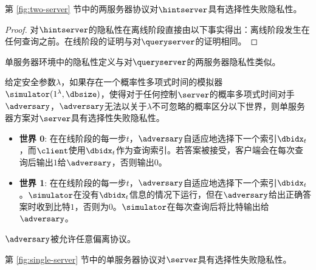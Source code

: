 \begin{theorem}
    第 \ref{fig:two-server} 节中的两服务器协议对$\hintserver$具有选择性失败隐私性。
\end{theorem}
    
\begin{proof}
    对$\hintserver$的隐私性在离线阶段直接由以下事实得出：离线阶段发生在任何查询之前。在线阶段的证明与对$\queryserver$的证明相同。
\end{proof}
    
单服务器环境中的隐私性定义与对$\queryserver$的两服务器隐私性类似。
    
\begin{definition}
    给定安全参数$\lambda$，如果存在一个概率性多项式时间的模拟器$\simulator(1^\lambda, \dbsize)$，使得对于任何控制$\server$的概率多项式时间对手$\adversary$，$\adversary$无法以关于$\lambda$不可忽略的概率区分以下世界，则单服务器方案对$\server$具有选择性失败隐私性。
    
    \begin{itemize}
        \item \textbf{世界 0}: 在在线阶段的每一步$t$，$\adversary$自适应地选择下一个索引$\dbidx_t$，而$\client$使用$\dbidx_t$作为查询索引。若答案被接受，客户端会在每次查询后输出$1$给$\adversary$，否则输出$0$。
        \item \textbf{世界 1}: 在在线阶段的每一步$t$，$\adversary$自适应地选择下一个索引$\dbidx_t$。$\simulator$在没有$\dbidx_t$信息的情况下运行，但在$\adversary$给出正确答案时收到比特$1$，否则为$0$。$\simulator$在每次查询后将比特输出给$\adversary$。
    \end{itemize}$\adversary$被允许任意偏离协议。
\end{definition}
    
\begin{theorem}
    第 \ref{fig:single-server} 节中的单服务器协议对$\server$具有选择性失败隐私性。
\end{theorem}
    
